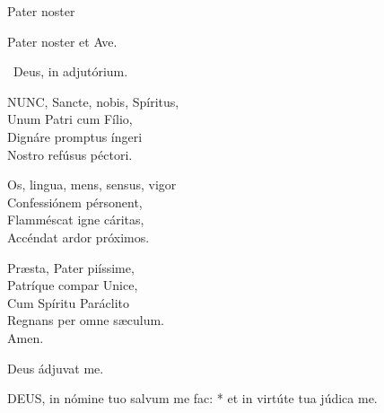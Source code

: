  Pater noster 


Pater noster et Ave.

\V\ Deus, in adjutórium.


\lettrine[lines=2]{N}{UNC}, Sancte, nobis, Spíritus,\\
Unum Patri cum Fílio,\\
Dignáre promptus íngeri\\
Nostro refúsus péctori.

Os, lingua, mens, sensus, vigor\\
Confessiónem pérsonent,\\
Flamméscat igne cáritas,\\
Accéndat ardor próximos.

Præsta, Pater piíssime,\\
Patríque compar Unice,\\
Cum Spíritu Paráclito\\
Regnans per omne sæculum.\\
Amen.

 Deus ádjuvat me.


\lettrine[lines=2]{D}{EUS}, in nómine tuo salvum me fac: * et in virtúte tua júdica me.

